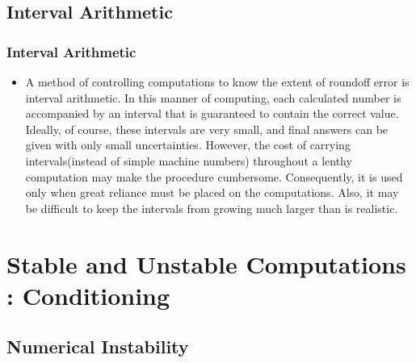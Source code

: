 \documentclass[notheorems,mathserif,table,compress]{beamer}  %
\begin{document}
\subsection{Interval Arithmetic}

\begin{frame}
\frametitle{Interval Arithmetic}
\begin{itemize}
\item A method of controlling computations to know the extent of roundoff error is interval arithmetic. In this manner of computing, each calculated number is accompanied by an interval that is guaranteed to contain the correct value. Ideally, of course, these intervals are very small, and final answers can be given with only small uncertainties. However, the cost of carrying intervals(instead of simple machine numbers) throughout a lenthy computation may make the procedure cumbersome. Consequently, it is used only when great reliance must be placed on the computations. Also, it may be difficult to keep the intervals from growing much larger than is realistic.
\end{itemize}
\end{frame}

\section{Stable and Unstable Computations : Conditioning}

\subsection{Numerical Instability}
\end{document}
